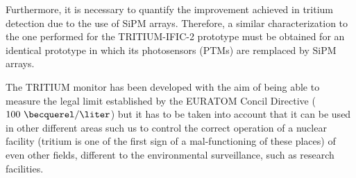 Furthermore, it is necessary to quantify the improvement achieved in tritium detection due to the use of SiPM arrays. Therefore, a similar characterization to the one performed for the TRITIUM-IFIC-2 prototype must be obtained for an identical prototype in which its photosensors (PTMs) are remplaced by SiPM arrays.

The TRITIUM monitor has been developed with the aim of being able to measure the legal limit established by the EURATOM Concil Directive ($100~\becquerel/\liter$) but it has to be taken into account that it can be used in other different areas such us to control the correct operation of a nuclear facility (tritium is one of the first sign of a mal-functioning of these places) of even other fields, different to the environmental surveillance, such as research facilities.
